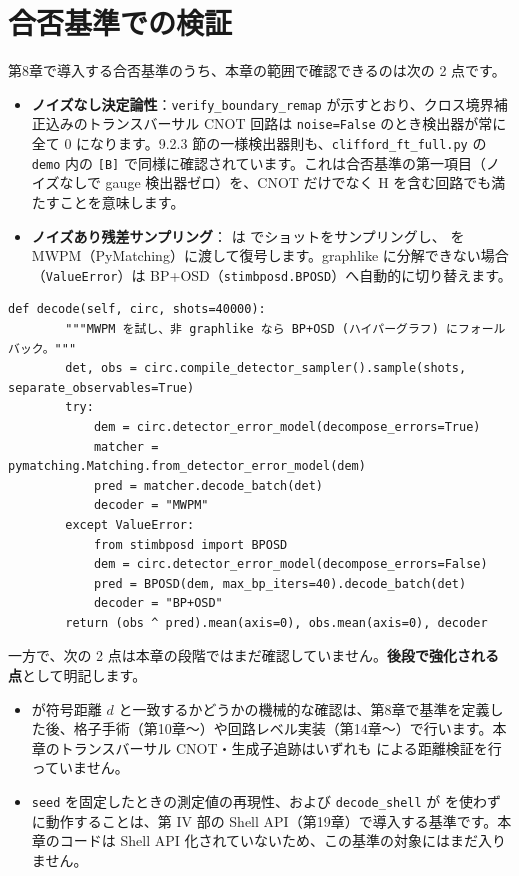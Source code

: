 \section{合否基準での検証}\label{sec:acceptance}

第8章で導入する合否基準のうち、本章の範囲で確認できるのは次の 2 点です。

\begin{itemize}
  \item \textbf{ノイズなし決定論性}：\texttt{verify\_boundary\_remap} が示すとおり、クロス境界補正込みのトランスバーサル CNOT 回路は \texttt{noise=False} のとき検出器が常に全て 0 になります。9.2.3 節の一様検出器則も、\texttt{clifford\_ft\_full.py} の \texttt{demo} 内の \texttt{[B]} で同様に確認されています。これは合否基準の第一項目（ノイズなしで gauge 検出器ゼロ）を、CNOT だけでなく H を含む回路でも満たすことを意味します。
  \item \textbf{ノイズあり残差サンプリング}： は  でショットをサンプリングし、 を MWPM（PyMatching）に渡して復号します。graphlike に分解できない場合（\texttt{ValueError}）は BP+OSD（\texttt{stimbposd.BPOSD}）へ自動的に切り替えます。
\end{itemize}

\begin{lstlisting}[caption={MWPM を試し、非 graphlike なら BP+OSD に切り替える復号（src/stages/01\_mpp/src/ftqc/clifford\_ft\_full.py）}]
    def decode(self, circ, shots=40000):
        """MWPM を試し、非 graphlike なら BP+OSD (ハイパーグラフ) にフォールバック。"""
        det, obs = circ.compile_detector_sampler().sample(shots, separate_observables=True)
        try:
            dem = circ.detector_error_model(decompose_errors=True)
            matcher = pymatching.Matching.from_detector_error_model(dem)
            pred = matcher.decode_batch(det)
            decoder = "MWPM"
        except ValueError:
            from stimbposd import BPOSD
            dem = circ.detector_error_model(decompose_errors=False)
            pred = BPOSD(dem, max_bp_iters=40).decode_batch(det)
            decoder = "BP+OSD"
        return (obs ^ pred).mean(axis=0), obs.mean(axis=0), decoder
\end{lstlisting}

一方で、次の 2 点は本章の段階ではまだ確認していません。\textbf{後段で強化される点}として明記します。

\begin{itemize}
  \item {} が符号距離 $d$ と一致するかどうかの機械的な確認は、第8章で基準を定義した後、格子手術（第10章〜）や回路レベル実装（第14章〜）で行います。本章のトランスバーサル CNOT・生成子追跡はいずれも  による距離検証を行っていません。
  \item \texttt{seed} を固定したときの測定値の再現性、および \texttt{decode\_shell} が  を使わずに動作することは、第 IV 部の Shell API（第19章）で導入する基準です。本章のコードは Shell API 化されていないため、この基準の対象にはまだ入りません。
\end{itemize}

